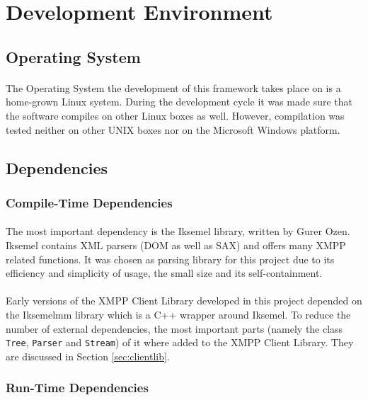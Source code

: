 \section{Development Environment}

\subsection{Operating System}
\paragraph{}
The Operating System the development of this framework takes place on is a home-grown Linux system. During the development cycle it was made sure that the software compiles on other Linux boxes as well. However, compilation was tested neither on other UNIX boxes nor on the Microsoft Windows platform.

\subsection{Dependencies}
\label{sec:depend}

\subsubsection{Compile-Time Dependencies}
\label{sec:compdepend}
\paragraph{}
The most important dependency is the Iksemel library, written by Gurer Ozen. Iksemel contains XML parsers (DOM as well as SAX) and offers many XMPP related functions. It was chosen as parsing library for this project due to its efficiency and simplicity of usage, the small size and its self-containment.

\paragraph{}
Early versions of the XMPP Client Library developed in this project depended on the Iksemelmm library which is a C++ wrapper around Iksemel. To reduce the number of external dependencies, the most important parts (namely the class \texttt{Tree}, \texttt{Parser} and \texttt{Stream}) of it where added to the XMPP Client Library. They are discussed in Section \ref{sec:clientlib}.


\subsubsection{Run-Time Dependencies}
